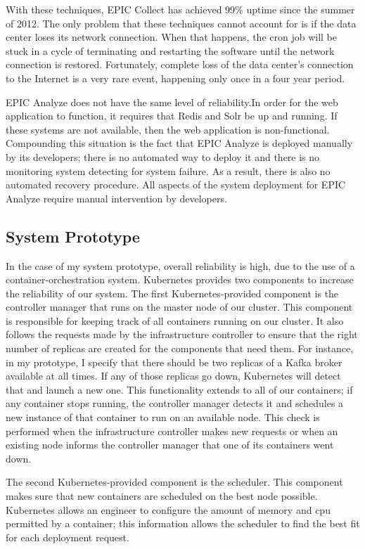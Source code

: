 With these techniques, EPIC Collect has achieved 99\% uptime since the summer of 2012. The only problem that these techniques cannot account for is if the data center loses its network connection. When that happens, the cron job will be stuck in a cycle of terminating and restarting the software until the network connection is restored. Fortunately, complete loss of the data center’s connection to the Internet is a very rare event, happening only once in a four year period.

EPIC Analyze does not have the same level of reliability.In order for the web application to function, it requires that Redis and Solr be up and running. If these systems are not available, then the web application is non-functional. Compounding this situation is the fact that EPIC Analyze is deployed manually by its developers; there is no automated way to deploy it and there is no monitoring system detecting for system failure. As a result, there is also no automated recovery procedure. All aspects of the system deployment for EPIC Analyze require manual intervention by developers.

\subsection{System Prototype}

In the case of my system prototype, overall reliability is high, due to the use of a container-orchestration system. Kubernetes provides two components to increase the reliability of our system. The first Kubernetes-provided component is the controller manager that runs on the master node of our cluster. This component is responsible for keeping track of all containers running on our cluster. It also follows the requests made by the infrastructure controller to ensure that the right number of replicas are created for the components that need them. For instance, in my prototype, I specify that there should be two replicas of a Kafka broker available at all times. If any of those replicas go down, Kubernetes will detect that and launch a new one. This functionality extends to all of our containers; if any container stops running, the controller manager detects it and schedules a new instance of that container to run on an available node. This check is performed when the infrastructure controller makes new requests or when an existing node informs the controller manager that one of its containers went down.

The second Kubernetes-provided component is the scheduler. This component makes sure that new containers are scheduled on the best node possible. Kubernetes allows an engineer to configure the amount of memory and cpu permitted by a container; this information allows the scheduler to find the best fit for each deployment request.

